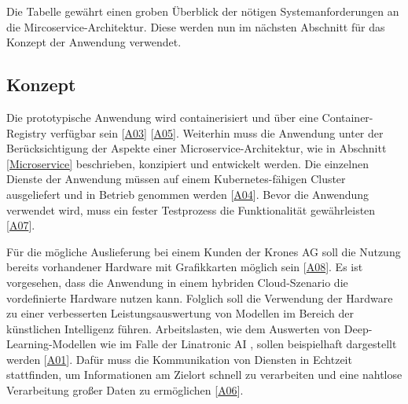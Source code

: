 Die Tabelle gewährt einen groben Überblick der nötigen Systemanforderungen an die Mircoservice-Architektur. 
Diese werden nun im nächsten Abschnitt für das Konzept der Anwendung verwendet.









\subsection{Konzept}\label{Konzept}
Die prototypische Anwendung wird containerisiert und über eine Container-Registry verfügbar sein [\hyperlink{A03}{A03}] [\hyperlink{A05}{A05}]. 
Weiterhin muss die Anwendung unter der Berücksichtigung der Aspekte einer Microservice-Architektur, wie in Abschnitt \ref{Microservice} beschrieben, konzipiert und entwickelt werden. 
Die einzelnen Dienste der Anwendung müssen auf einem Kubernetes-fähigen Cluster ausgeliefert und in Betrieb genommen werden [\hyperlink{A04}{A04}].
Bevor die Anwendung verwendet wird, muss ein fester Testprozess die Funktionalität gewährleisten [\hyperlink{A07}{A07}].

Für die mögliche Auslieferung bei einem Kunden der Krones AG soll die Nutzung bereits vorhandener Hardware mit Grafikkarten möglich sein [\hyperlink{A08}{A08}]. 
Es ist vorgesehen, dass die Anwendung in einem hybriden Cloud-Szenario die vordefinierte Hardware nutzen kann. Folglich soll die Verwendung der Hardware zu einer verbesserten Leistungsauswertung von Modellen im Bereich der künstlichen Intelligenz führen. 
Arbeitslasten, wie dem Auswerten von Deep-Learning-Modellen wie im Falle der Linatronic AI \cite{linatronic}, sollen beispielhaft dargestellt werden [\hyperlink{A01}{A01}]. 
Dafür muss die Kommunikation von Diensten in Echtzeit stattfinden, um Informationen am Zielort schnell zu verarbeiten und eine nahtlose Verarbeitung großer Daten zu ermöglichen [\hyperlink{A06}{A06}].


